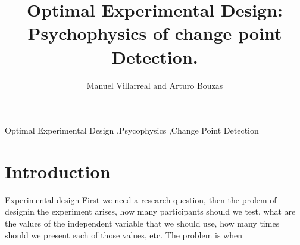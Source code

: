 \documentclass[preprint,review,12pt]{elsarticle}
\begin{document}
\begin{frontmatter}


\title{Optimal Experimental Design: Psychophysics of change point Detection.}




\author{Manuel Villarreal and Arturo Bouzas}

\address{Mexico City, Mexico}

\begin{abstract}
\end{abstract}

\begin{keyword}
Optimal Experimental Design \sep Psycophysics \sep Change Point Detection


\end{keyword}

\end{frontmatter}

\linenumbers

\section{Introduction}
\label{S:1}

Experimental design
First we need a research question, then the prolem of designin the experiment arises, how many participants should we test, what are the values of the independent variable that we should use, how many times should we present each of those values, etc. The problem is when 
\end{document}
